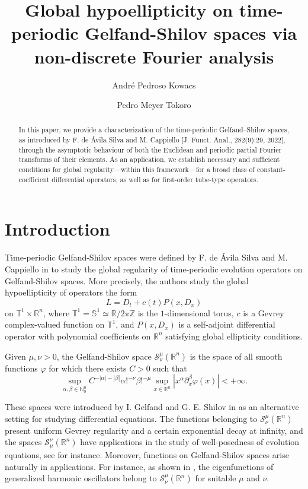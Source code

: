 \documentclass[11pt,reqno]{amsart}
\title[Global hypoellipticity on time-periodic Gelfand-Shilov spaces]{Global hypoellipticity on time-periodic Gelfand-Shilov spaces via non-discrete Fourier analysis}
\author[A. Kowacs]{Andr\'e Pedroso Kowacs}
\author[P. Tokoro]{Pedro Meyer Tokoro}
\numberwithin{equation}{section}
\theoremstyle{definition}
\theoremstyle{definition}
\newcommand{\T}{\mathbb{T}}
\newcommand{\R}{\mathbb{R}}
\newcommand{\Z}{\mathbb{Z}}
\newcommand{\N}{\mathbb{N}}
\begin{document}
\begin{abstract}
In this paper, we provide a characterization of the time-periodic Gelfand–Shilov spaces, as introduced by F. de \'Avila Silva and M. Cappiello [J. Funct. Anal., 282(9):29, 2022], through the asymptotic behaviour of both the Euclidean and periodic partial Fourier transforms of their elements. As an application, we establish necessary and sufficient conditions for global regularity---within this framework---for a broad class of constant-coefficient differential operators, as well as for first-order tube-type operators.
\end{abstract}

\maketitle

\section{Introduction}

Time-periodic Gelfand-Shilov spaces were defined by F. de \'Avila Silva and M. Cappiello in \cite{AvCap2022} to study the global regularity of time-periodic evolution operators on Gelfand-Shilov spaces. More precisely, the authors study the global hypoellipticity of operators the form
\[L=D_t+c(t)P(x,D_x)\]
on $\T^1\times\R^n$, where  $\T^1=\mathbb{S}^1\simeq\R/2\pi\Z$ is the $1$-dimensional torus, $c$ is a Gevrey complex-valued function on $\T^1$, and $P(x,D_x)$ is a self-adjoint differential operator with polynomial coefficients on $\R^n$ satisfying global ellipticity conditions.

Given $\mu,\nu>0$, the Gelfand-Shilov space $\mathcal{S}_\nu^\mu(\R^n)$ is the space of all smooth functions $\varphi$ for which there exists $C>0$ such that
\[\sup_{\alpha,\beta\in\N_0^n}C^{-|\alpha|-|\beta|}\alpha!^{-\nu}\beta!^{-\mu}\sup_{x\in\R^n}|x^\alpha\partial_x^\beta \varphi(x)|<+\infty.\]

These spaces were introduced by I. Gelfand and G. E. Shilov in \cite{GelfandShilov} as an alternative setting for studying differential equations. The functions belonging to $\mathcal{S}_\nu^\mu(\R^n)$ present uniform Gevrey regularity and a certain exponential decay at infinity, and the spaces $\mathcal{S}_\mu^\nu(\R^n)$ have applications in the study of well-posedness of evolution equations, see \cite{AAC2022,AC2019} for instance. Moreover, functions on Gelfand-Shilov spaces arise naturally in applications. For instance, as shown in \cite{CGR2011}, the eigenfunctions of generalized harmonic oscillators belong to $\mathcal{S}_\nu^\mu(\R^n)$ for suitable $\mu$ and $\nu$.
\end{document}
